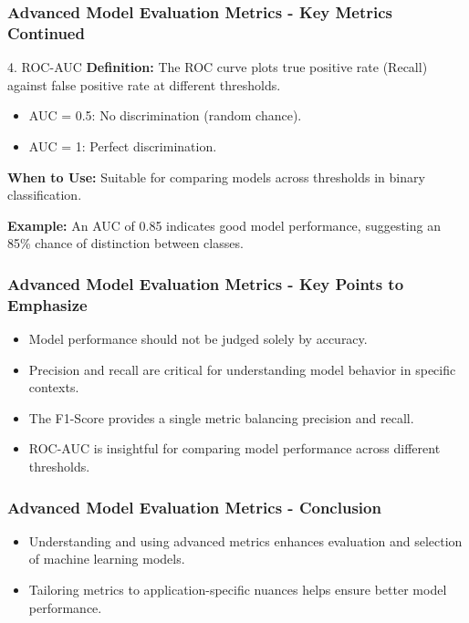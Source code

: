 \documentclass[aspectratio=169]{beamer}
\begin{document}
\begin{frame}[fragile]
    \frametitle{Advanced Model Evaluation Metrics - Key Metrics Continued}
    \begin{block}{4. ROC-AUC}
        \textbf{Definition:} The ROC curve plots true positive rate (Recall) against false positive rate at different thresholds.
        \begin{itemize}
            \item AUC = 0.5: No discrimination (random chance).
            \item AUC = 1: Perfect discrimination.
        \end{itemize}
        \textbf{When to Use:} Suitable for comparing models across thresholds in binary classification.

        \textbf{Example:} An AUC of 0.85 indicates good model performance, suggesting an 85\% chance of distinction between classes.
    \end{block}
\end{frame}

\begin{frame}[fragile]
    \frametitle{Advanced Model Evaluation Metrics - Key Points to Emphasize}
    \begin{itemize}
        \item Model performance should not be judged solely by accuracy.
        \item Precision and recall are critical for understanding model behavior in specific contexts.
        \item The F1-Score provides a single metric balancing precision and recall.
        \item ROC-AUC is insightful for comparing model performance across different thresholds.
    \end{itemize}
\end{frame}

\begin{frame}[fragile]
    \frametitle{Advanced Model Evaluation Metrics - Conclusion}
    \begin{itemize}
        \item Understanding and using advanced metrics enhances evaluation and selection of machine learning models.
        \item Tailoring metrics to application-specific nuances helps ensure better model performance.
    \end{itemize}
\end{frame}
\end{document}
